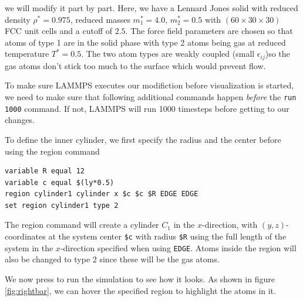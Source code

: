 \documentclass[12pt,a4paper,final]{iopart}
\newcommand{\code}[1]{\colorbox{light-gray}{\color{RawSienna}\texttt{#1}}}
\begin{document}

we will modify it part by part.
Here, we have a Lennard Jones solid with reduced density
$\rho^* = 0.975$, reduced masses $m_1^* = 4.0$, $m_2^* = 0.5$ with $(60\times30\times30)$
FCC unit cells and a cutoff of $2.5$. 
The force field parameters are chosen so that atoms of type 1
are in the solid phase with type 2 atoms being gas at reduced temperature $T^*=0.5$.
The two atom types are weakly coupled (small $\epsilon_{ij}$)so the gas atoms don't
stick too much to the surface which would prevent flow.

To make sure LAMMPS executes our modifiction before visualization is started,
we need to make sure that following additional commands happen \textit{before} the \code{run 1000} command.
If not, LAMMPS will run 1000 timesteps before getting to our changes.

To define the inner cylinder, we first specify the radius and the center before using the region command
\begin{lstlisting}
variable R equal 12
variable c equal $(ly*0.5)
region cylinder1 cylinder x $c $c $R EDGE EDGE
set region cylinder1 type 2
\end{lstlisting}
The region command will create a cylinder $C_1$ in the $x$-direction, with $(y,z)$-coordinates at the system center \code{\$c} with radius \code{\$R} using the full length of the system in the $x$-direction specified when using \code{EDGE}.
Atoms inside the region will also be changed to type 2 since these will be the gas atoms.

We now press  to run the simulation to see how it looks.
As shown in figure \ref{fig:rightbar}, we can hover the specified region to highlight the atoms in it.
\end{document}
